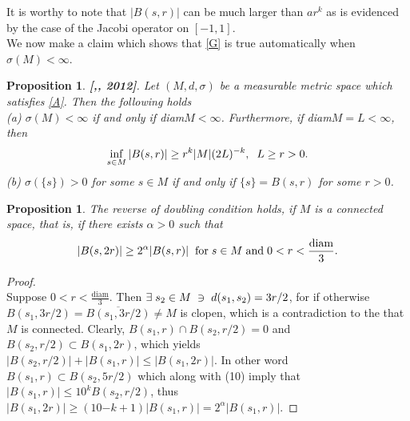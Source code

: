 \documentclass[10pt]{article}
\newtheorem{prop}[thm]{Proposition}
\theoremstyle{definition}
\numberwithin{equation}{section}
\begin{document}
	It is worthy to note that $ |B(s,r)| $ can be much larger than $ar^k$ as is evidenced by the case of the
	Jacobi operator on $[-1, 1]$.\\
	We now make a claim which shows that \eqref{G} is true automatically when $ \sigma (M) < \infty$.\\
	\begin{prop}
		\normalfont
		\textbf{[\cite{Coulhon1},\cite{Coulhon2}, 2012]}.
		Let $(M,d,\sigma)$ be a measurable metric space which satisfies \eqref{A}. Then the following holds\\
		(a) 	$\sigma (M) < \infty$ if and only if diam$ M < \infty$. Furthermore, if diam$M = L < \infty$, then
		\begin{equation}
			\inf_{s\in M} |B(s,r)| \geq r^k|M|(2L)^{-k}, \hspace{0.2 cm} L \geq r >0.
		\end{equation}
		(b) $ \sigma (\{s\}) > 0$ for some $s \in M$ if and only if $\{s\} = B(s,r)$ for some $r >0$.\\
	\end{prop}
	\begin{prop}
		\normalfont
		The reverse of doubling condition holds, if $M$ is a connected space, that is, if there exists $ \alpha >0$ such that
		$$ |B(s,2r)| \geq 2^{\alpha} |B(s,r)| \hspace{0.2 cm} \mbox{for} \hspace{0.1 cm} s\in M \hspace{0.1 cm} \mbox{and} \hspace{0.1 cm} 0<r< \frac{\mbox{diam}}{3}.$$
	\end{prop}
	\begin{proof}
		\ \\
		\normalfont
		Suppose $0<r< \frac{\mbox{diam}}{3}$. Then $\exists \hspace{0.1 cm} s_2 \in M \hspace{0.1 cm} \ni \hspace{0.1 cm} d(s_1,s_2) = 3r/2 $, for if otherwise $B(s_1, 3r/2) = \overline{B(s_1, 3r/2)}
		\neq M $ is clopen, which is a contradiction to the that $M$ is connected. Clearly, $B(s_1,r) \cap B(s_2, r/2) = 0$ and $B(s_2, r/2) \subset B(s_1, 2r)$, which yields $ |B(s_2, r/2)|+|B(s_1, r)|\leq |B(s_1, 2r)|$. In other word $B(s_1, r) \subset B(s_2, 5r/2)$ which along with (10) imply that $|B(s_1,r)| \leq 10^k B(s_2,r/2)$, thus $|B(s_1, 2r)| \geq (10{-k} +1)|B(s_1, r)| = 2^{\alpha} |B(s_1, r)|.$
	\end{proof}
	
\end{document}
